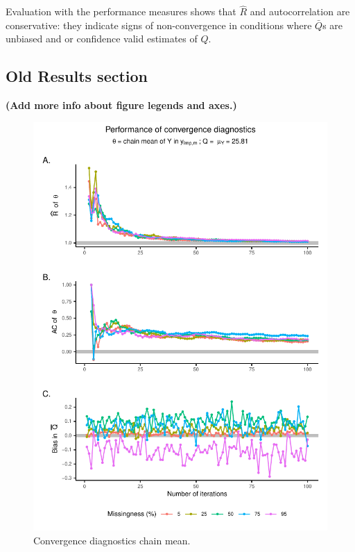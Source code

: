 \documentclass[Royal,times,sageh]{sagej}
\begin{document}
Evaluation with the performance measures shows that \(\widehat{R}\) and
autocorrelation are conservative: they indicate signs of non-convergence
in conditions where \(\bar{Q}\)s are unbiased and or confidence valid
estimates of \(Q\).

\hypertarget{old-results-section}{%
\subsection{Old Results section}\label{old-results-section}}

\textbf{(Add more info about figure legends and axes.)}

\begin{figure}

{\centering \includegraphics{manuscript_files/figure-latex/mean-1} 

}

\caption{Convergence diagnostics chain mean.}\label{fig:mean}
\end{figure}
\end{document}
